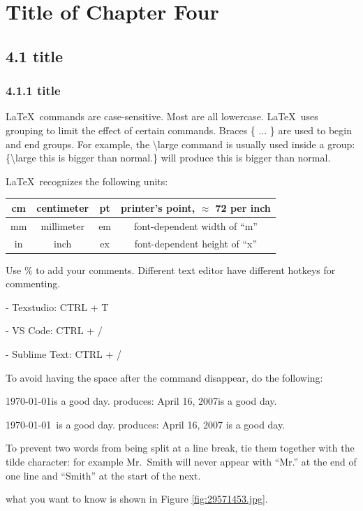 \documentclass[a4paper,11pt,UTF8,openright]{book}
\begin{document}
\chapter{Title of Chapter Four}
\lipsum[1-2]

\section{4.1 title}
\lipsum[1-3]

\subsection{4.1.1 title}

\LaTeX\ commands are case-sensitive. Most are all lowercase. \LaTeX\ uses grouping to limit the effect of certain commands. Braces \{ ... \} are used to begin and end groups. For example, the
\textbackslash large command is usually used inside a group: \{\textbackslash large this is bigger than normal.\}  will produce {\large this is bigger than normal.} 

\LaTeX\ recognizes the following units:
\vskip 0.2in
\begin{tabular}{|c|c||c|c|}
  \hline 
  cm & centimeter & pt & printer’s point, $\approx$ 72 per inch \\ \hline
  mm & millimeter & em & font-dependent width of “m” \\ 	\hline
  in & inch & ex & font-dependent height of “x” \\ 	\hline
\end{tabular}
\vskip 0.2in

Use \% to add your comments. Different text editor have different hotkeys for commenting.

- Texstudio: CTRL + T

- VS Code: CTRL + /

- Sublime Text: CTRL + /

To avoid having the space after the command disappear, do the following:

\today is a good day. produces: April 16, 2007is a good day.

\today\ is a good day. produces: April 16, 2007 is a good day.

To prevent two words from being split at a line break, tie them together with the tilde character: for example Mr.~Smith will never appear with “Mr.” at the end of one line and “Smith” at the start of the next.


what you want to know is shown in Figure \ref{fig:29571453.jpg}.
\end{document}
